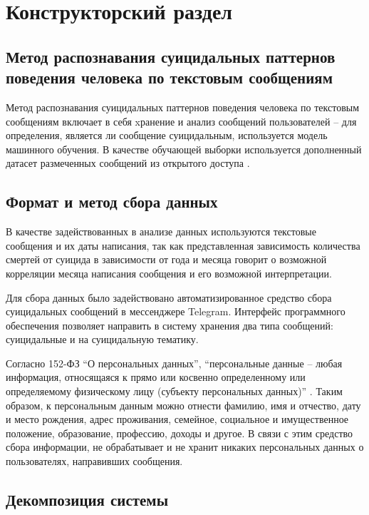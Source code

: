 \section{Конструкторский раздел}

\subsection{Метод распознавания суицидальных паттернов поведения человека по текстовым сообщениям}

Метод распознавания суицидальных паттернов поведения человека по текстовым сообщениям включает в себя xранение и анализ сообщений пользователей -- для определения, является ли сообщение суицидальным, используется модель машинного обучения. В качестве обучающей выборки используется дополненный датасет размеченных сообщений из открытого доступа \cite{dataset}.

\subsection{Формат и метод сбора данных }

В качестве задействованных в анализе данных используются текстовые сообщения и их даты написания, так как представленная зависимость количества смертей от суицида в зависимости от года и месяца говорит о возможной корреляции месяца написания сообщения и его возможной интерпретации.

Для сбора данных было задействовано автоматизированное средство сбора суицидальных сообщений в мессенджере Telegram. Интерфейс программного обеспечения позволяет направить в систему хранения два типа сообщений: суицидальные и на суицидальную тематику. 

Согласно 152-ФЗ ``О персональных данных'', ``персональные данные -- любая информация, относящаяся к прямо или косвенно определенному или определяемому физическому лицу (субъекту персональных данных)'' \cite{fzpers}. Таким образом, к персональным данным можно отнести фамилию, имя и отчество, дату и место рождения, адрес проживания, семейное, социальное и имущественное положение, образование, профессию, доходы и другое. В связи с этим средство сбора информации, не обрабатывает и не хранит никаких персональных данных о пользователях, направивших сообщения.

\subsection{Декомпозиция системы}

